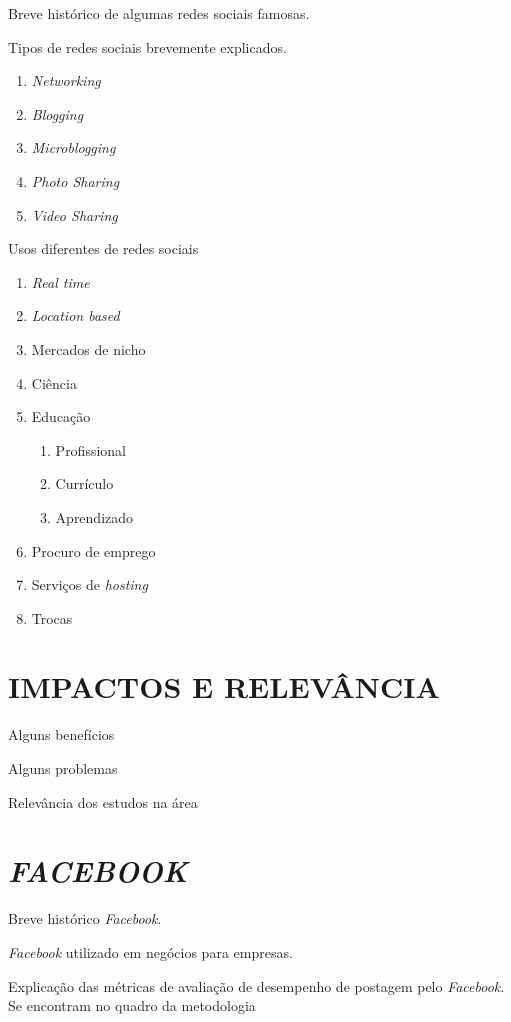 Breve histórico de algumas redes sociais famosas.

Tipos de redes sociais brevemente explicados.

\begin{enumerate}
	\item \textit{Networking}
	\item \textit{Blogging}
	\item \textit{Microblogging}
	\item \textit{Photo Sharing}
	\item \textit{Video Sharing}
\end{enumerate}

Usos diferentes de redes sociais

\begin{enumerate}
	\item \textit{Real time}
	\item \textit{Location based}
	\item Mercados de nicho
	\item Ciência
	\item Educação
	\begin{enumerate}
		\item Profissional
		\item Currículo
		\item Aprendizado
	\end{enumerate}
	\item Procuro de emprego
	\item Serviços de \textit{hosting}
	\item Trocas
\end{enumerate}

\section{IMPACTOS E RELEVÂNCIA}
\label{sec:classRedesSociais}
Alguns benefícios

Alguns problemas

Relevância dos estudos na área

\section{\textit{FACEBOOK}}
\label{sec:facebookRedesSociais}
Breve histórico \textit{Facebook}.

\textit{Facebook} utilizado em negócios para empresas.

Explicação das métricas de avaliação de desempenho de postagem pelo \textit{Facebook}. Se encontram no quadro da metodologia